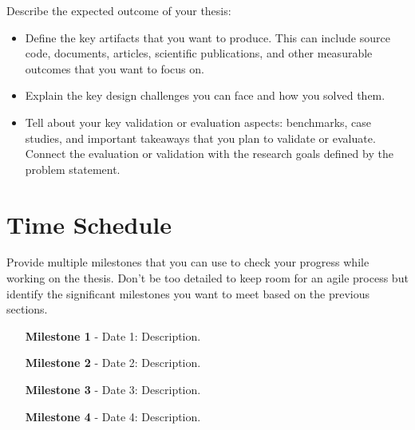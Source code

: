 \documentclass[
	pdftex,
	letterpaper,
	titlepage,
	final,
	oneside,
	11pt,
	DIV=calc,
]{scrbook}
\begin{document}
\begin{tcolorbox}[breakable]
	Describe the expected outcome of your thesis:
	\begin{itemize}
		\item Define the key artifacts that you want to produce. This can include source code, documents, articles, scientific publications, and other measurable outcomes that you want to focus on.
		\item Explain the key design challenges you can face and how you solved them.
		\item Tell about your key validation or evaluation aspects: benchmarks, case studies, and important takeaways that you plan to validate or evaluate. Connect the evaluation or validation with the research goals defined by the problem statement.
	\end{itemize}
\end{tcolorbox}

\section*{Time Schedule}

\begin{tcolorbox}[breakable]
	Provide multiple milestones that you can use to check your progress while working on the thesis.
	Don't be too detailed to keep room for an agile process but identify the significant milestones you want to meet based on the previous sections.
\end{tcolorbox}

\begin{itemize}[itemindent=-13pt, leftmargin=43pt, align=left]
    \item[\textbf{Milestone 1} - Date 1:] Description.
    \item[\textbf{Milestone 2} - Date 2:] Description.
    \item[\textbf{Milestone 3} - Date 3:] Description.
    \item[\textbf{Milestone 4} - Date 4:] Description.
\end{itemize}


\backmatter


\end{document}
